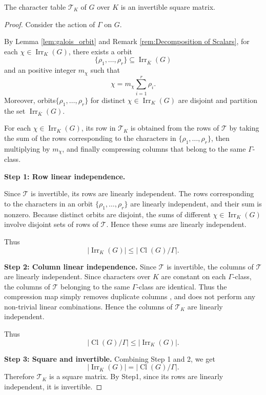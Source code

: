 \begin{prop}
\label{prop:char_table_invertible_K}
The character table \(\mathcal T_K\) of \(G\) over \(K\) is an invertible square matrix.
\end{prop}

\begin{proof}
Consider the action of $\Gamma$ on $G$.

By Lemma \ref{lem:galois_orbit} and Remark \ref{rem:Decomposition of Scalars}, for each \(\chi \in \operatorname{Irr}_K(G)\), there exists a orbit
\[
\{\rho_1, \dots, \rho_r\} \subseteq \operatorname{Irr}_{\overline K}(G)
\]
and an positive integer \(m_\chi \) such that
\[
\chi = m_\chi \sum_{i=1}^r \rho_i. 
\]
Moreover, orbits\(\{\rho_1, \dots, \rho_r\}\) for distinct \(\chi \in \operatorname{Irr}_K(G)\) are disjoint and partition the set \(\operatorname{Irr}_{\overline K}(G)\).

For each \(\chi \in \operatorname{Irr}_K(G)\), its row in \(\mathcal T_K\) is obtained from the rows of \(\mathcal T\) by taking the sum of the rows corresponding to the characters in \(\{\rho_1, \dots, \rho_r\}\), then multiplying by \(m_\chi\), and finally compressing columns that belong to the same \(\Gamma\)-class.

\medskip
\noindent\textbf{Step 1: Row linear independence.}  

Since \(\mathcal T\) is invertible, its rows are linearly independent. The rows corresponding to the characters in an orbit \(\{\rho_1, \dots, \rho_r\}\) are linearly independent, and their sum is nonzero. Because distinct orbits are disjoint, the sums of different \(\chi \in \operatorname{Irr}_K(G)\) involve disjoint sets of rows of \(\mathcal T\). Hence these sums are linearly independent.

Thus
\[
|\operatorname{Irr}_K(G)| \le |\operatorname{Cl}(G)/\Gamma|.
\]

\medskip
\noindent\textbf{Step 2: Column linear independence.}  
Since \(\mathcal T\) is invertible, the columns of \(\mathcal T\) are linearly independent. Since characters over $K$ are constant on each \(\Gamma\)-class, the columns of \(\mathcal T\) belonging to the same \(\Gamma\)-class are identical. Thus the compression map simply removes duplicate columns , and does not perform any non-trivial linear combinations. Hence the columns of \(\mathcal T_K\) are linearly independent.

Thus
\[
|\operatorname{Cl}(G)/\Gamma| \le |\operatorname{Irr}_K(G)|.
\]

\medskip
\noindent\textbf{Step 3: Square and invertible.}  
Combining Step 1 and 2, we get
\[
|\operatorname{Irr}_K(G)| = |\operatorname{Cl}(G)/\Gamma|.
\]
Therefore \(\mathcal T_K\) is a square matrix. By Step1, since its rows are linearly independent, it is invertible.
\end{proof}

